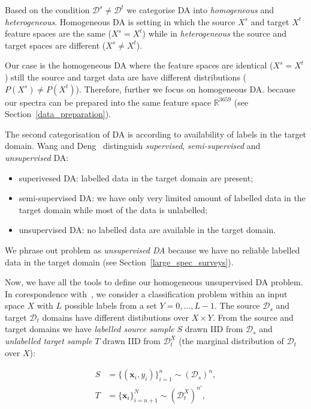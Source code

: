 Based on the condition \(\mathcal{D}^s \ne \mathcal{D}^t\)
we categorise DA into \textit{homogeneous} and \textit{heterogeneous}.
Homogeneous DA is setting in which the source \(X^s\)
and target \(X^t\) feature spaces are the same (\(X^s = X^t\))
while in \textit{heterogeneous} the source and target spaces are different
(\(X^s \ne X^t\)).~\cite{csurka2017}

Our case is the homogeneous DA
where the feature spaces are identical (\(X^s = X^t\))
still the source and target data are have different distributions (\(P(X^s) \ne P(X^t)\)).
Therefore, further we focus on homogeneous DA.
because our spectra can be prepared into the same feature space \(\mathbb{R}^{3659}\)
(see Section~\ref{data_preparation}).

The second categorisation of DA is according to availability of labels in the target domain.
Wang and Deng~\cite{wang2018} distinguish \textit{supervised}, \textit{semi-supervised} and \textit{unsupervised} DA:

\begin{itemize}
	\item superivesed DA: labelled data in the target domain are present;
	\item semi-supervised DA: we have only very limited amount of labelled data in the target domain while most of the data is unlabelled;
	\item unsupervised DA: no labelled data are available in the target domain.
\end{itemize}

We phrase out problem as \textit{unsupervised DA}
because we have no reliable labelled data in the target domain
(see Section~\ref{large_spec_surveys}).

Now, we have all the tools to define our homogeneous unsupervised DA problem.
In corespondence with~\cite{ganin2016},
we consider a classification problem within an input space \(X\)
with \(L\) possible labels from a set \(Y = {0, \dots, L - 1}\).
The source \(\mathcal{D}_s\) and target \(\mathcal{D}_t\) domains
have different distibutions over \(X \times Y\).
From the source and target domains
we have \textit{labelled source sample} \(S\) drawn IID from \(\mathcal{D}_s\)
and \textit{unlabelled target sample} \(T\) drawn IID from \(\mathcal{D}^X_t\) 
(the marginal distribution of \(\mathcal{D}_t\) over \(X\)):

\begin{align}
	S &= \{(\mathbf{x}_i, y_i)\}^n_{i = 1} \sim (\mathcal{D}_s)^n, \\
	T &= \{\mathbf{x}_i\}^N_{i = n + 1} \sim (\mathcal{D}^X_t)^{n'},
\end{align}

